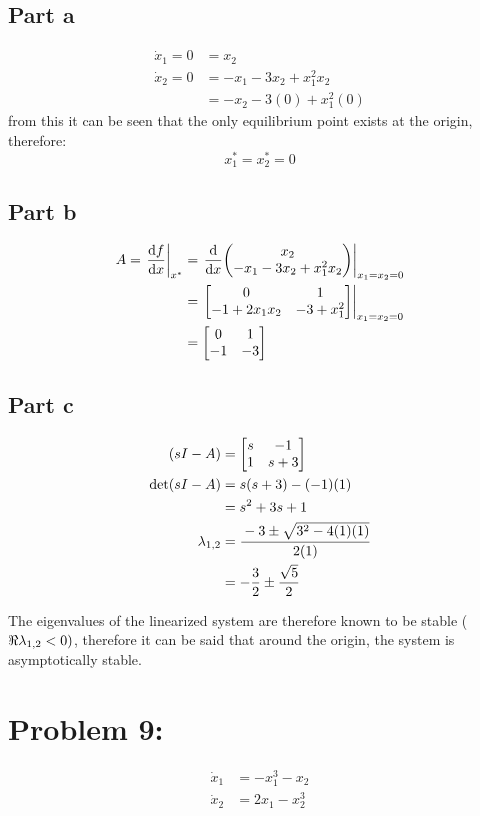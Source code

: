 \documentclass[]{article}
\begin{document}
\subsection{Part a}
\begin{align*}
	\dot{x}_1 = 0 &= x_2\\
	\dot{x}_2 = 0 &= -x_1 - 3 x_2 + x_1^2 x_2\\
	&= -x_2 -3(0) +x_1^2(0)
\end{align*}
from this it can be seen that the only equilibrium point exists at the origin, therefore:
\begin{displaymath}
	x_1^* = x_2^* = 0
\end{displaymath}

\subsection{Part b}
\begin{align*}
	A = \eval{\dv{f}{x}}_{x^*} &= \eval{\dv{x} \mqty(x_2\\ -x_1 - 3 x_2 + x_1^2 x_2)}_{x_1=x_2=0}\\
	&= \eval{\mqty[0 & 1\\ -1 + 2 x_1 x_2 & -3 + x_1^2]}_{x_1=x_2=0}\\
	&= \mqty[0&1\\ -1 & -3]
\end{align*}

\subsection{Part c}
\begin{align*}
	(sI - A)
	&= \mqty[s & -1\\ 1 & s+3]\\
	\det(sI-A)
	&= s (s+3) - (-1)(1)\\
	&= s^2 + 3 s + 1\\
	\lambda_{1,2}
	&= \cfrac{-3 \pm \sqrt{3^2 - 4(1)(1)}}{2(1)}\\
	&= -\frac{3}{2} \pm \frac{\sqrt{5}}{2}
\end{align*}

The eigenvalues of the linearized system are therefore known to be stable ($\real{\lambda_{1,2}} < 0)$, therefore it can be said that around the origin, the system is asymptotically stable.

\newpage
\section{Problem 9:}
\begin{align*}
	\dot{x}_1 &= -x_1^3 -x_2\\
	\dot{x}_2 &= 2x_1 -x_2^3
\end{align*}
\end{document}
